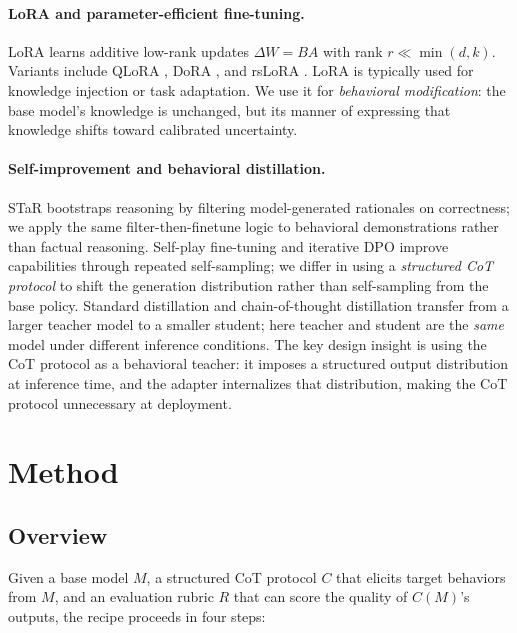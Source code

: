 \documentclass{article}
\begin{document}
\paragraph{LoRA and parameter-efficient fine-tuning.} LoRA \citep{hu2022lora} learns additive low-rank updates $\Delta W = BA$ with rank $r \ll \min(d,k)$. Variants include QLoRA \citep{dettmers2023qlora}, DoRA \citep{liu2024dora}, and rsLoRA \citep{kalajdzievski2023scaling}. LoRA is typically used for knowledge injection or task adaptation. We use it for \emph{behavioral modification}: the base model's knowledge is unchanged, but its manner of expressing that knowledge shifts toward calibrated uncertainty.

\paragraph{Self-improvement and behavioral distillation.} STaR \citep{zelikman2022star} bootstraps reasoning by filtering model-generated rationales on correctness; we apply the same filter-then-finetune logic to behavioral demonstrations rather than factual reasoning. Self-play fine-tuning \citep{chen2024selfplay} and iterative DPO \citep{yuan2024selfrewarding} improve capabilities through repeated self-sampling; we differ in using a \emph{structured CoT protocol} to shift the generation distribution rather than self-sampling from the base policy. Standard distillation \citep{hinton2015distilling} and chain-of-thought distillation \citep{ho2023large, magister2023teaching} transfer from a larger teacher model to a smaller student; here teacher and student are the \emph{same} model under different inference conditions. The key design insight is using the CoT protocol as a behavioral teacher: it imposes a structured output distribution at inference time, and the adapter internalizes that distribution, making the CoT protocol unnecessary at deployment.

\section{Method}
\label{sec:method}

\subsection{Overview}

Given a base model $M$, a structured CoT protocol $C$ that elicits target behaviors from $M$, and an evaluation rubric $R$ that can score the quality of $C(M)$'s outputs, the recipe proceeds in four steps:
\end{document}
